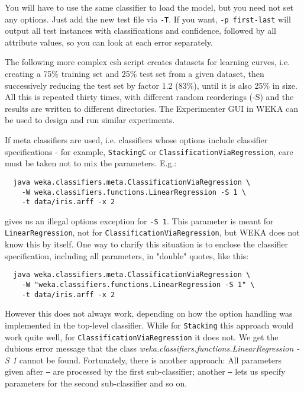 \noindent You will have to use the same classifier to load the model, but you need not set any options. Just add the new test file via \texttt{-T}. If you want, \texttt{-p first-last} will output all test instances with classifications and confidence, followed by all attribute values, so you can look at each error separately.

The following more complex csh script creates datasets for learning curves, i.e. creating a 75\% training set and 25\% test set from a given dataset, then successively reducing the test set by factor 1.2 (83\%), until it is also 25\% in size. All this is repeated thirty times, with different random reorderings (-S) and the results are written to different directories. The Experimenter GUI in WEKA can be used to design and run similar experiments.

{\scriptsize
}

If meta classifiers are used, i.e. classifiers whose options include classifier specifications - for example, \texttt{StackingC} or \texttt{ClassificationViaRegression}, care must be taken not to mix the parameters. E.g.:

{\scriptsize
\begin{verbatim}
  java weka.classifiers.meta.ClassificationViaRegression \
    -W weka.classifiers.functions.LinearRegression -S 1 \
    -t data/iris.arff -x 2
\end{verbatim}}

\noindent gives us an illegal options exception for \texttt{-S 1}. This parameter is meant for \texttt{LinearRegression}, not for \texttt{ClassificationViaRegression}, but WEKA does not know this by itself. One way to clarify this situation is to enclose the classifier specification, including all parameters, in "double" quotes, like this:

{\scriptsize
\begin{verbatim}
  java weka.classifiers.meta.ClassificationViaRegression \
    -W "weka.classifiers.functions.LinearRegression -S 1" \
    -t data/iris.arff -x 2
\end{verbatim}}

\noindent However this does not always work, depending on how the option handling was implemented in the top-level classifier. While for \texttt{Stacking} this approach would work quite well, for \texttt{ClassificationViaRegression} it does not. We get the dubious error message that the class \textit{weka.classifiers.functions.LinearRegression -S 1} cannot be found. Fortunately, there is another approach: All parameters given after \texttt{--} are processed by the first sub-classifier; another \texttt{--} lets us specify parameters for the second sub-classifier and so on.

